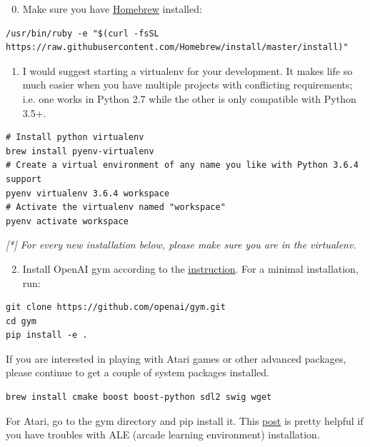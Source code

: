 \begin{enumerate}
\setcounter{enumi}{-1}
\tightlist
\item
  Make sure you have \href{https://docs.brew.sh/Installation}{Homebrew} installed:
\end{enumerate}

\begin{verbatim}
/usr/bin/ruby -e "$(curl -fsSL https://raw.githubusercontent.com/Homebrew/install/master/install)"
\end{verbatim}

\begin{enumerate}
\tightlist
\item
  I would suggest starting a virtualenv for your development. It makes life so much easier when you have multiple projects with conflicting requirements; i.e. one works in Python 2.7 while the other is only compatible with Python 3.5+.
\end{enumerate}

\begin{verbatim}
# Install python virtualenv
brew install pyenv-virtualenv
# Create a virtual environment of any name you like with Python 3.6.4 support
pyenv virtualenv 3.6.4 workspace
# Activate the virtualenv named "workspace"
pyenv activate workspace
\end{verbatim}

\emph{{[}*{]} For every new installation below, please make sure you are in the virtualenv.}

\begin{enumerate}
\setcounter{enumi}{1}
\tightlist
\item
  Install OpenAI gym according to the \href{https://github.com/openai/gym\#installation}{instruction}. For a minimal installation, run:
\end{enumerate}

\begin{verbatim}
git clone https://github.com/openai/gym.git 
cd gym 
pip install -e .
\end{verbatim}

If you are interested in playing with Atari games or other advanced packages, please continue to get a couple of system packages installed.

\begin{verbatim}
brew install cmake boost boost-python sdl2 swig wget
\end{verbatim}

For Atari, go to the gym directory and pip install it. This \href{http://alvinwan.com/installing-arcade-learning-environment-with-python3-on-macosx/}{post} is pretty helpful if you have troubles with ALE (arcade learning environment) installation.

